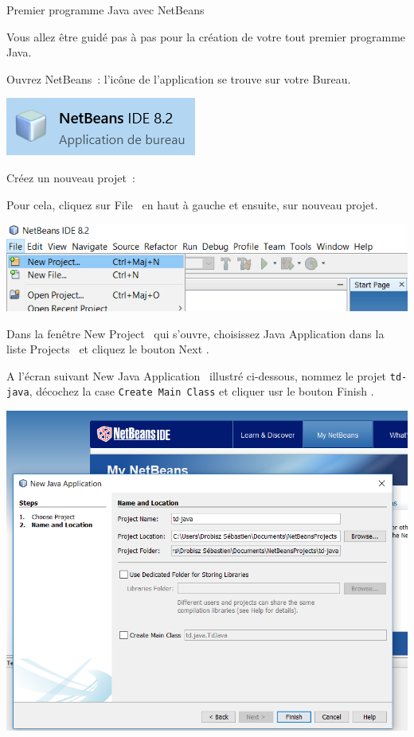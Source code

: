 \documentclass[a4paper,11pt]{article}
\begin{document}
	\begin{Tutoriel}{Premier programme Java avec NetBeans}
	
	Vous allez être guidé pas à pas pour la création de votre tout premier programme Java.
	
	\begin{steps}
		\item Ouvrez NetBeans~:
			l'icône de l'application se trouve sur votre Bureau. 
		
			\bigskip
			\begin{center}
				\includegraphics{images/nb_icone}
			\end{center}


		\item Créez un nouveau projet~: 
		
			Pour cela, cliquez sur \og File \fg~en haut à gauche et ensuite, sur nouveau projet. 
			
			\bigskip
			\begin{center}
				\includegraphics[width=.9\textwidth]{images/nb_newproject}
			\end{center}
			
			Dans la fenêtre \og New Project \fg~qui s'ouvre, choisissez \og Java Application \fg dans la liste \og Projects \fg~et cliquez le bouton \og Next \fg.
			
			A l'écran suivant \og New Java Application \fg~illustré ci-dessous, 
			nommez le projet \texttt{td-java}, décochez la case \texttt{Create Main Class} et cliquer usr le bouton \og Finish \fg.
			
			\begin{center}
				\includegraphics[width=.9\textwidth]{images/nb_newproject_name}
			\end{center}
			

\end{steps}
\end{Tutoriel}
\end{document}

